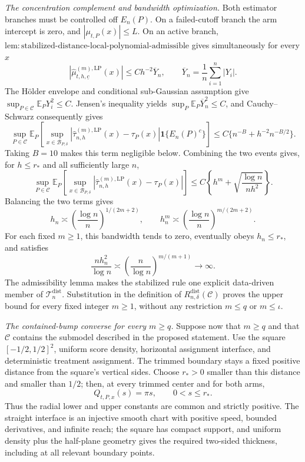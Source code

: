\emph{The concentration complement and bandwidth optimization.}
Both estimator branches must be controlled off \(E_n(P)\).  On a failed-cutoff branch the arm intercept is zero, and \(|\mu_{t,P}(x)|\leq L\).  On an active branch, \(\mathrm{lem:stabilized\text{-}distance\text{-}local\text{-}polynomial\text{-}admissible}\) gives simultaneously for every \(x\)
\[
 \left|\widehat\mu^{(m),\mathrm{LP}}_{t,h,\underline c}(x)\right|
 \leq Ch^{-2}\overline Y_n,
 \qquad
 \overline Y_n=\frac1n\sum_{i=1}^n|Y_i|.
\]
The H\"older envelope and conditional sub-Gaussian assumption give \(\sup_{P\in\mathcal C}\mathbb E_PY_i^2\leq C\).  Jensen's inequality yields \(\sup_P\mathbb E_P\overline Y_n^2\leq C\), and Cauchy--Schwarz consequently gives
\[
 \sup_{P\in\mathcal C}\mathbb E_P\!\left[
 \sup_{x\in\mathcal B_{P,\delta}}
 |\widehat\tau^{(m),\mathrm{LP}}_{n,h}(x)-\tau_P(x)|
 \mathbf1\{E_n(P)^c\}
 \right]
 \leq C\{n^{-B}+h^{-2}n^{-B/2}\}.
\]
Taking \(B=10\) makes this term negligible below.  Combining the two events gives, for \(h\leq r_*\) and all sufficiently large \(n\),
\[
 \sup_{P\in\mathcal C}\mathbb E_P\!\left[
 \sup_{x\in\mathcal B_{P,\delta}}
 |\widehat\tau^{(m),\mathrm{LP}}_{n,h}(x)-\tau_P(x)|
 \right]
 \leq C\left\{h^m+\sqrt{\frac{\log n}{nh^2}}\right\}.
\]
Balancing the two terms gives
\[
 h_n\asymp\left(\frac{\log n}{n}\right)^{1/(2m+2)},
 \qquad
 h_n^m\asymp\left(\frac{\log n}{n}\right)^{m/(2m+2)}.
\]
For each fixed \(m\geq1\), this bandwidth tends to zero, eventually obeys \(h_n\leq r_*\), and satisfies
\[
 \frac{nh_n^2}{\log n}
 \asymp\left(\frac n{\log n}\right)^{m/(m+1)}\longrightarrow\infty.
\]
The admissibility lemma makes the stabilized rule one explicit data-driven member of \(\mathcal T_n^{\mathrm{dist}}\).  Substitution in the definition of \(R_{n,\delta}^{\mathrm{dist}}(\mathcal C)\) proves the upper bound for every fixed integer \(m\geq1\), without any restriction \(m\leq q\) or \(m\leq\iota\).

\emph{The contained-bump converse for every \(m\geq q\).}
Suppose now that \(m\geq q\) and that \(\mathcal C\) contains the submodel described in the proposed statement.  Use the square \([-1/2,1/2]^2\), uniform score density, horizontal assignment interface, and deterministic treatment assignment.  The trimmed boundary stays a fixed positive distance from the square's vertical sides.  Choose \(r_*>0\) smaller than this distance and smaller than \(1/2\); then, at every trimmed center and for both arms,
\[
 Q_{t,P,x}(s)=\pi s,
 \qquad 0<s\leq r_*.
\]
Thus the radial lower and upper constants are common and strictly positive.  The straight interface is an injective smooth chart with positive speed, bounded derivatives, and infinite reach; the square has compact support, and uniform density plus the half-plane geometry gives the required two-sided thickness, including at all relevant boundary points.


